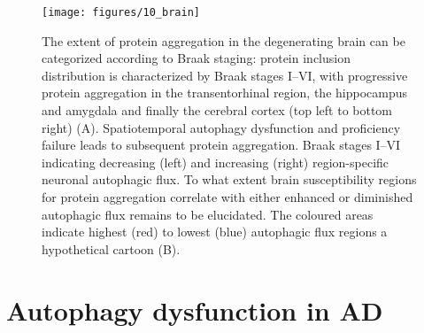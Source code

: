 \begin{figure}[!htbp]
  \center
  \texttt{[image: figures/10\_brain]}
  \caption{The extent of protein aggregation in the degenerating brain can be categorized according to Braak staging: protein inclusion distribution is characterized by Braak stages I–VI, with progressive protein aggregation in the transentorhinal region, the hippocampus and amygdala and finally the cerebral cortex (top left to bottom right) (A). Spatiotemporal autophagy dysfunction and proficiency failure leads to subsequent protein aggregation. Braak stages I–VI indicating decreasing (left) and increasing (right) region-specific neuronal autophagic flux. To what extent brain susceptibility regions for protein aggregation correlate with either enhanced or diminished autophagic flux remains to be elucidated. The coloured areas indicate highest (red) to lowest (blue) autophagic flux regions a hypothetical cartoon (B).}
  \label{fig:10_brain}
\end{figure}

\section{Autophagy dysfunction in AD}
